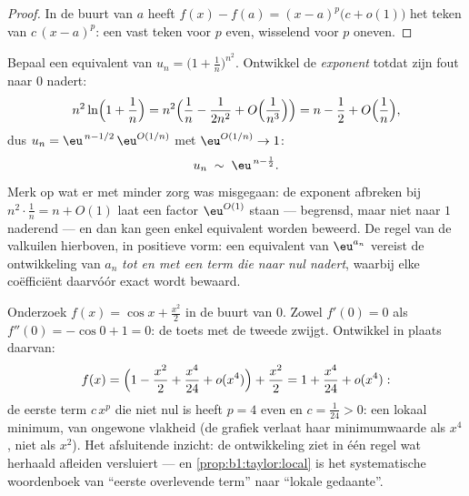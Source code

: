 \begin{proof}
In de buurt van $a$ heeft $f(x) - f(a) = (x-a)^p\bigl(c +
o(1)\bigr)$ het teken van $c\,(x-a)^p$: een vast teken voor $p$
even, wisselend voor $p$ oneven.
\end{proof}

\begin{example}\label{ex:b1:taylor:expdiscipline}
Bepaal een equivalent van $u_n = \bigl(1 + \frac1n\bigr)^{n^2}$.
Ontwikkel de \emph{exponent} totdat zijn fout naar $0$ nadert:
\[
n^2 \ln\Bigl(1 + \frac1n\Bigr)
= n^2\Bigl(\frac1n - \frac{1}{2n^2} +
O\Bigl(\frac{1}{n^3}\Bigr)\Bigr)
= n - \frac12 + O\Bigl(\frac1n\Bigr),
\]
dus $u_n = \eu^{\,n - 1/2}\,\eu^{O(1/n)}$ met $\eu^{O(1/n)} \to
1$:
\[
u_n \;\sim\; \eu^{\,n - \frac12} .
\]
Merk op wat er met minder zorg was misgegaan: de exponent
afbreken bij $n^2\cdot\frac1n = n + O(1)$ laat een factor
$\eu^{O(1)}$ staan --- begrensd, maar niet naar $1$ naderend ---
en dan kan geen enkel equivalent worden beweerd. De regel van de
valkuilen hierboven, in positieve vorm: een equivalent van
$\eu^{a_n}$ vereist de ontwikkeling van $a_n$ \emph{tot en met
een term die naar nul nadert}, waarbij elke coëfficiënt daarvóór
exact wordt bewaard.
\end{example}

\begin{example}\label{ex:b1:taylor:flatmin}
Onderzoek $f(x) = \cos x + \frac{x^2}{2}$ in de buurt van $0$.
Zowel $f'(0) = 0$ als $f''(0) = -\cos 0 + 1 = 0$: de toets met de
tweede  zwijgt. Ontwikkel in plaats daarvan:
\[
f(x) = \Bigl(1 - \frac{x^2}{2} + \frac{x^4}{24} +
o(x^4)\Bigr) + \frac{x^2}{2}
= 1 + \frac{x^4}{24} + o(x^4) :
\]
de eerste term $c\,x^p$ die niet nul is heeft $p = 4$ even en $c
= \frac{1}{24} > 0$: een lokaal minimum, van ongewone vlakheid
(de grafiek verlaat haar minimumwaarde als $x^4$, niet als
$x^2$). Het afsluitende inzicht: de ontwikkeling ziet in één
regel wat herhaald afleiden versluiert --- en
\cref{prop:b1:taylor:local} is het systematische woordenboek van
``eerste overlevende term'' naar ``lokale gedaante''.
\end{example}

